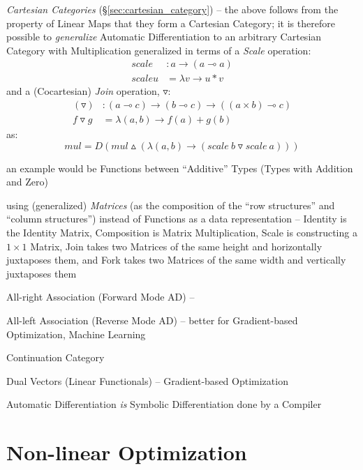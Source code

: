 \emph{Cartesian Categories} (\S\ref{sec:cartesian_category}) -- the above
follows from the property of Linear Maps that they form a Cartesian Category; it
is therefore possible to \emph{generalize} Automatic Differentiation to an
arbitrary Cartesian Category with Multiplication generalized in terms of a
\emph{Scale} operation:
\begin{align*}
scale   & : a \rightarrow (a \multimap a) \\
scale u & = \lambda v \rightarrow u * v
\end{align*}
and a (Cocartesian) \emph{Join} operation, $\triangledown$:
\begin{align*}
  (\triangledown)   & : (a \multimap c) \rightarrow (b \multimap c) \rightarrow
    ((a \times b) \multimap c) \\
  f \triangledown g & = \lambda (a,b) \rightarrow f(a) + g(b)
\end{align*}
as:
\[
mul = D (mul \vartriangle
  (\lambda (a,b) \rightarrow (scale\ b \triangledown scale\ a)))
\]

an example would be Functions between ``Additive'' Types (Types with Addition
and Zero)

using (generalized) \emph{Matrices} (as the composition of the ``row
structures'' and ``column structures'') instead of Functions as a data
representation -- Identity is the Identity Matrix, Composition is Matrix
Multiplication, Scale is constructing a $1 \times 1$ Matrix, Join takes two
Matrices of the same height and horizontally juxtaposes them, and Fork takes two
Matrices of the same width and vertically juxtaposes them

All-right Association (Forward Mode AD) --

All-left Association (Reverse Mode AD) -- better for Gradient-based
Optimization, Machine Learning

Continuation Category

Dual Vectors (Linear Functionals) -- Gradient-based Optimization

Automatic Differentiation \emph{is} Symbolic Differentiation done by a Compiler



\section{Non-linear Optimization}\label{sec:nonlinear_optimization}

